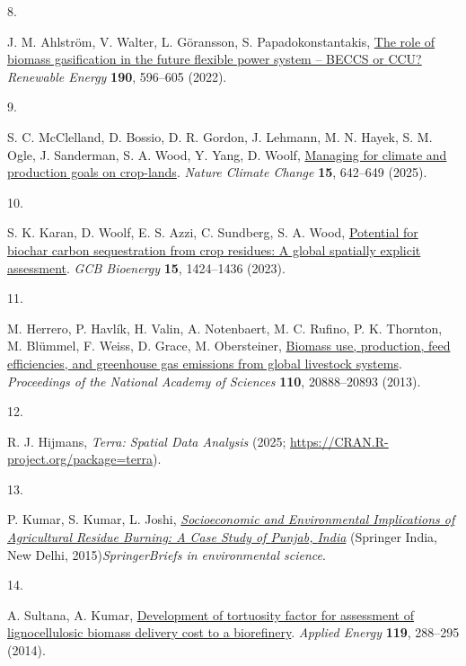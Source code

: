 \documentclass[
  letterpaper,
]{article}
\newlength{\cslhangindent}
\newlength{\csllabelwidth}
\newenvironment{CSLReferences}[2] %
 {\begin{list}{}{%
  \setlength{\itemindent}{0pt}
  \setlength{\leftmargin}{0pt}
  \setlength{\parsep}{0pt}
  \ifodd #1
   \setlength{\leftmargin}{\cslhangindent}
   \setlength{\itemindent}{-1\cslhangindent}
  \fi
  \setlength{\itemsep}{#2\baselineskip}}}
 {\end{list}}
\newcommand{\CSLLeftMargin}[1]{\parbox[t]{\csllabelwidth}{\strut#1\strut}}
\newcommand{\CSLRightInline}[1]{\parbox[t]{\linewidth - \csllabelwidth}{\strut#1\strut}}
\begin{document}
\begin{CSLReferences}{0}{1}
\CSLLeftMargin{8. }%
\CSLRightInline{J. M. Ahlström, V. Walter, L. Göransson, S.
Papadokonstantakis,
\href{https://doi.org/10.1016/j.renene.2022.03.100}{The role of biomass
gasification in the future flexible power system -- {BECCS} or {CCU}?}
\emph{Renewable Energy} \textbf{190}, 596--605 (2022).}

\CSLLeftMargin{9. }%
\CSLRightInline{S. C. McClelland, D. Bossio, D. R. Gordon, J. Lehmann,
M. N. Hayek, S. M. Ogle, J. Sanderman, S. A. Wood, Y. Yang, D. Woolf,
\href{https://doi.org/10.1038/s41558-025-02337-7}{Managing for climate
and production goals on crop-lands}. \emph{Nature Climate Change}
\textbf{15}, 642--649 (2025).}

\CSLLeftMargin{10. }%
\CSLRightInline{S. K. Karan, D. Woolf, E. S. Azzi, C. Sundberg, S. A.
Wood, \href{https://doi.org/10.1111/gcbb.13102}{Potential for biochar
carbon sequestration from crop residues: A global spatially explicit
assessment}. \emph{GCB Bioenergy} \textbf{15}, 1424--1436 (2023).}

\CSLLeftMargin{11. }%
\CSLRightInline{M. Herrero, P. Havlík, H. Valin, A. Notenbaert, M. C.
Rufino, P. K. Thornton, M. Blümmel, F. Weiss, D. Grace, M. Obersteiner,
\href{https://doi.org/10.1073/pnas.1308149110}{Biomass use, production,
feed efficiencies, and greenhouse gas emissions from global livestock
systems}. \emph{Proceedings of the National Academy of Sciences}
\textbf{110}, 20888--20893 (2013).}

\CSLLeftMargin{12. }%
\CSLRightInline{R. J. Hijmans, \emph{Terra: Spatial Data Analysis}
(2025; \url{https://CRAN.R-project.org/package=terra}).}

\CSLLeftMargin{13. }%
\CSLRightInline{P. Kumar, S. Kumar, L. Joshi,
\emph{\href{https://doi.org/10.1007/978-81-322-2014-5}{Socioeconomic and
Environmental Implications of Agricultural Residue Burning: A Case Study
of {Punjab}, {India}}} (Springer India, New Delhi,
2015)\emph{SpringerBriefs in environmental science}.}

\CSLLeftMargin{14. }%
\CSLRightInline{A. Sultana, A. Kumar,
\href{https://doi.org/10.1016/j.apenergy.2013.12.036}{Development of
tortuosity factor for assessment of lignocellulosic biomass delivery
cost to a biorefinery}. \emph{Applied Energy} \textbf{119}, 288--295
(2014).}


\end{CSLReferences}
\end{document}
